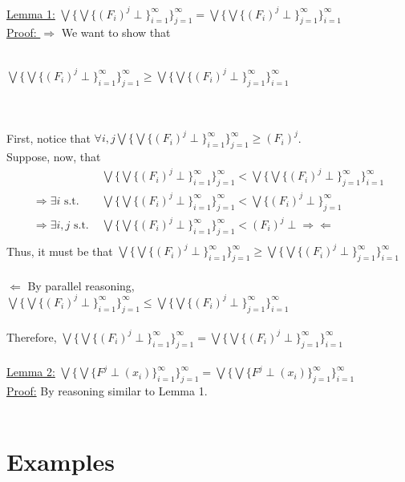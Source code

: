 \documentclass{westhesis}
\begin{document}
 \underline{Lemma 1:} $\bigvee\{\bigvee\{(F_i)^j \perp\}^{\infty}_{i=1}\}^{\infty}_{j=1}= \bigvee\{\bigvee\{(F_i)^j \perp\}^{\infty}
 _{j=1}\}^{\infty}_{i=1}$\\
 \underline{Proof: } $\Rightarrow$ We want to show that\\ \\ \centerline{$\bigvee\{\bigvee\{(F_i)^j \perp\}^{\infty}_{i=1}\}^{\infty}
 _{j=1} \geq  \bigvee\{\bigvee\{(F_i)^j \perp\}^{\infty}_{j=1}\}^{\infty}_{i=1}$} \\ \\ First, notice that $\forall i, j \bigvee\{\bigvee
 \{(F_i)^j \perp\}^{\infty}_{i=1}\}^{\infty}_{j=1} \geq (F_i)^j$. \\
 Suppose, now, that 
 \begin{align*}
 &\bigvee\{\bigvee\{(F_i)^j \perp\}^{\infty}_{i=1}\}^{\infty}_{j=1} < \bigvee\{\bigvee\{(F_i)^j \perp\}^{\infty}_{j=1}\}^{\infty}_{i=1}\\ 
 \Rightarrow \exists i \text{ s.t. \ \  \ } &\bigvee\{\bigvee\{(F_i)^j \perp\}^{\infty}_{i=1}\}^{\infty}_{j=1} < \bigvee\{(F_i)^j \perp\}
 ^{\infty}_{j=1}\\
 \Rightarrow \exists i, j \text{ s.t. } &\bigvee\{\bigvee\{(F_i)^j \perp\}^{\infty}_{i=1}\}^{\infty}_{j=1} < (F_i)^j \perp 
 \Rightarrow\Leftarrow\\
 \end{align*}
 Thus, it must be that $\bigvee\{\bigvee\{(F_i)^j \perp\}^{\infty}_{i=1}\}^{\infty}_{j=1} \geq  \bigvee\{\bigvee\{(F_i)^j \perp\}^{\infty}
 _{j=1}\}^{\infty}_{i=1}$ \\ \\
 $\Leftarrow$ By parallel reasoning, $\bigvee\{\bigvee\{(F_i)^j \perp\}^{\infty}_{i=1}\}^{\infty}_{j=1} \leq  \bigvee\{\bigvee\{(F_i)^j 
 \perp\}^{\infty}_{j=1}\}^{\infty}_{i=1}$ \\ \\
 Therefore, $\bigvee\{\bigvee\{(F_i)^j \perp\}^{\infty}_{i=1}\}^{\infty}_{j=1} = \bigvee\{\bigvee\{(F_i)^j \perp\}^{\infty}_{j=1}\}
 ^{\infty}_{i=1}$ \\ \\
 \underline{Lemma 2:} $\bigvee\{\bigvee\{F^j \perp(x_i)\}^{\infty}_{i=1}\}^{\infty}_{j=1} = \bigvee\{\bigvee\{F^j \perp(x_i)\}^{\infty}
 _{j=1}\}^{\infty}_{i=1}$\\ 
 \underline{Proof:} By reasoning similar to Lemma 1. \\ \\
 
\section{Examples}
\end{document}

